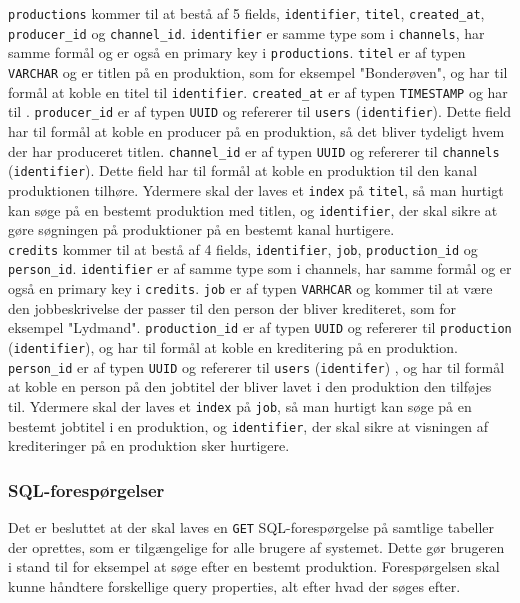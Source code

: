 \noindent
\texttt{productions} kommer til at bestå af 5 fields, \texttt{identifier}, \texttt{titel}, \texttt{created\_at}, \texttt{producer\_id} og \texttt{channel\_id}.  \texttt{identifier} er samme type som i \texttt{channels}, har samme formål og er også en primary key i \texttt{productions}. \texttt{titel} er af typen \texttt{VARCHAR} og er titlen på en produktion, som for eksempel "Bonderøven", og har til formål at koble en titel til \texttt{identifier}. \texttt{created\_at} er af typen \texttt{TIMESTAMP} og har til . \texttt{producer\_id} er af typen \texttt{UUID} og refererer til \texttt{users} (\texttt{identifier}). Dette field har til formål at koble en producer på en produktion, så det bliver tydeligt hvem der har produceret titlen. \texttt{channel\_id} er af typen \texttt{UUID} og refererer til \texttt{channels} (\texttt{identifier}). Dette field har til formål at koble en produktion til den kanal produktionen tilhøre. Ydermere skal der laves et \texttt{index} på \texttt{titel}, så man hurtigt kan søge på en bestemt produktion med titlen, og \texttt{identifier}, der skal sikre at gøre søgningen på produktioner på en bestemt kanal hurtigere.\\

\noindent
\texttt{credits} kommer til at bestå af 4 fields, \texttt{identifier}, \texttt{job}, \texttt{production\_id} og \texttt{person\_id}. \texttt{identifier} er af samme type som i channels, har samme formål og er også en primary key i \texttt{credits}. \texttt{job} er af typen \texttt{VARHCAR} og kommer til at være den jobbeskrivelse der passer til den person der bliver krediteret, som for eksempel "Lydmand". \texttt{production\_id} er af typen \texttt{UUID} og refererer til \texttt{production} (\texttt{identifier}), og har til formål at koble en kreditering på en produktion. \texttt{person\_id} er af typen \texttt{UUID} og refererer til  \texttt{users} (\texttt{identifer}) , og har til formål at koble en person på den jobtitel der bliver lavet i den produktion den tilføjes til. Ydermere skal der laves et \texttt{index} på \texttt{job}, så man hurtigt kan søge på en bestemt jobtitel i en produktion, og \texttt{identifier}, der skal sikre at visningen af krediteringer på en produktion sker hurtigere.

\subsubsection{SQL-forespørgelser}
Det er besluttet at der skal laves en \texttt{GET} SQL-forespørgelse på samtlige tabeller der oprettes, som er tilgængelige for alle brugere af systemet. Dette gør brugeren i stand til for eksempel at søge efter en bestemt produktion. Forespørgelsen skal kunne håndtere forskellige query properties, alt efter hvad der søges efter.\\

